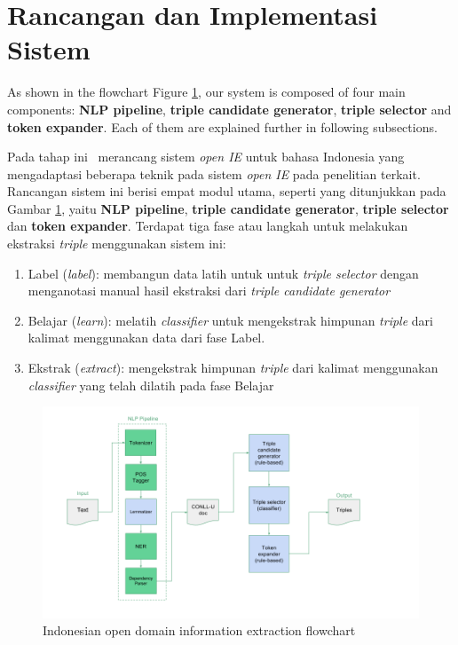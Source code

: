 \section{Rancangan dan Implementasi Sistem}

As shown in the flowchart Figure \ref{fig:program_flowchart}, our system is composed of four main components: \textbf{NLP pipeline}, \textbf{triple candidate generator}, \textbf{triple selector} and \textbf{token expander}. Each of them are explained further in following subsections.

Pada tahap ini \saya~merancang sistem \textit{open IE} untuk bahasa Indonesia yang mengadaptasi beberapa teknik pada sistem \textit{open IE} pada penelitian terkait. Rancangan sistem ini berisi empat modul utama, seperti yang ditunjukkan pada Gambar \ref{fig:program_flowchart}, yaitu \textbf{NLP pipeline}, \textbf{triple candidate generator}, \textbf{triple selector} dan \textbf{token expander}. Terdapat tiga fase atau langkah untuk melakukan ekstraksi \textit{triple} menggunakan sistem ini:

\begin{enumerate}
	\item Label (\textit{label}): membangun data latih untuk untuk \textit{triple selector} dengan menganotasi manual hasil ekstraksi dari \textit{triple candidate generator}
	\item Belajar (\textit{learn}): melatih \textit{classifier} untuk mengekstrak himpunan \textit{triple} dari kalimat menggunakan data dari fase Label.
	\item Ekstrak (\textit{extract}): mengekstrak himpunan \textit{triple} dari kalimat menggunakan \textit{classifier} yang telah dilatih pada fase Belajar
\end{enumerate}


\begin{figure}
\centering
\includegraphics[width=\textwidth]{../images/program_flowchart.png}
\caption{Indonesian open domain information extraction flowchart}
\label{fig:program_flowchart}
\end{figure}

